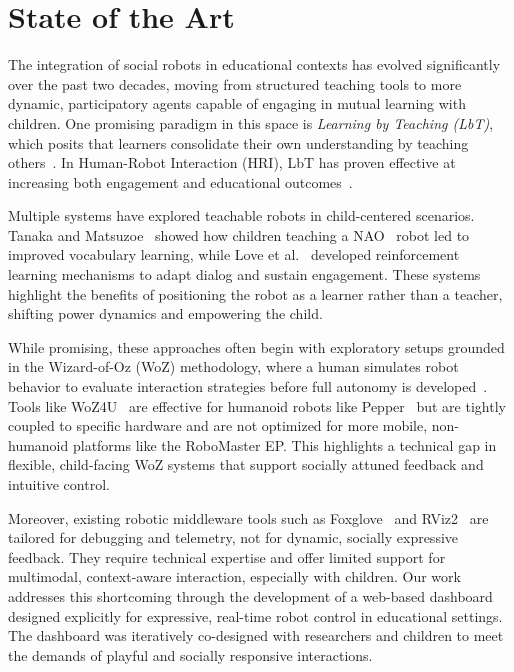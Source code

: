 \documentclass[a4paper]{usiinfbachelorproject}
\begin{document}
\section{\textbf{State of the Art}}\label{sec:background}
The integration of social robots in educational contexts has evolved significantly over the past two decades, moving from structured teaching tools to more dynamic, participatory agents capable of engaging in mutual learning with children.
One promising paradigm in this space is \textit{Learning by Teaching (LbT)}, which posits that learners consolidate their own understanding by teaching others~\cite{biswas2005learning}.
In Human-Robot Interaction (HRI), LbT has proven effective at increasing both engagement and educational outcomes~\cite{10.5898/JHRI.1.1.Tanaka, love2024teachable}.

Multiple systems have explored teachable robots in child-centered scenarios.
Tanaka and Matsuzoe~\cite{10.5898/JHRI.1.1.Tanaka} showed how children teaching a NAO~\cite{nao_robot} robot led to improved vocabulary learning, while Love et al.~\cite{love2023adapting, love2024teachable} developed reinforcement learning mechanisms to adapt dialog and sustain engagement.
These systems highlight the benefits of positioning the robot as a learner rather than a teacher, shifting power dynamics and empowering the child.

While promising, these approaches often begin with exploratory setups grounded in the Wizard-of-Oz (WoZ) methodology, where a human simulates robot behavior to evaluate interaction strategies before full autonomy is developed~\cite{weiss2010userWOZ, rietz2021woz4uPepper, SCHOONDERWOERD2022102831}.
Tools like WoZ4U~\cite{rietz2021woz4uPepper} are effective for humanoid robots like Pepper~\cite{pepper_robot} but are tightly coupled to specific hardware and are not optimized for more mobile, non-humanoid platforms like the RoboMaster EP.
This highlights a technical gap in flexible, child-facing WoZ systems that support socially attuned feedback and intuitive control.

Moreover, existing robotic middleware tools such as Foxglove~\cite{foxglove} and RViz2~\cite{rviz2} are tailored for debugging and telemetry, not for dynamic, socially expressive feedback.
They require technical expertise and offer limited support for multimodal, context-aware interaction, especially with children.
Our work addresses this shortcoming through the development of a web-based dashboard designed explicitly for expressive, real-time robot control in educational settings.
The dashboard was iteratively co-designed with researchers and children to meet the demands of playful and socially responsive interactions.
\end{document}
